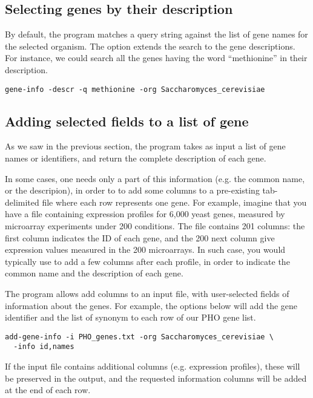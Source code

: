 \subsection{Selecting genes by their description}

By default, the program  matches a query string
against the list of gene names for the selected organism. The option
 extends the search to the gene descriptions. For
instance, we could search all the genes having the word ``methionine''
in their description. 

\begin{lstlisting}
gene-info -descr -q methionine -org Saccharomyces_cerevisiae
\end{lstlisting}

\subsection{Adding selected fields to a list of gene}

As we saw in the previous section, the program 
takes as input a list of gene names or identifiers, and return the
complete description of each gene.

In some cases, one needs only a part of this information (e.g. the
common name, or the descripion), in order to to add some columns to a
pre-existing tab-delimited file where each row represents one
gene. For example, imagine that you have a file containing expression
profiles for 6,000 yeast genes, measured by microarray experiments
under 200 conditions. The file contains 201 columns: the first column
indicates the ID of each gene, and the 200 next column give expression
values measured in the 200 microarrays. In such case, you would
typically use  to add a few columns after each
profile, in order to indicate the common name and the description of
each gene.

The program  allows add columns to an input
file, with user-selected fields of information about the genes. For
example, the options below will add the gene identifier and the list
of synonym to each row of our PHO gene list. 

\begin{lstlisting}
add-gene-info -i PHO_genes.txt -org Saccharomyces_cerevisiae \
  -info id,names
\end{lstlisting}

If the input file contains additional columns (e.g. expression
profiles), these will be preserved in the output, and the requested
information columns will be added at the end of each row.


